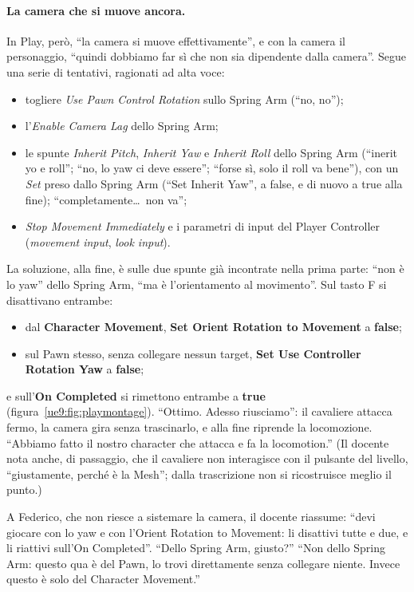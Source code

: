 \paragraph{La camera che si muove ancora.} In Play, però, ``la camera si muove
effettivamente'', e con la camera il personaggio, ``quindi dobbiamo far sì che non sia
dipendente dalla camera''. Segue una serie di tentativi, ragionati ad alta voce:
\begin{itemize}
  \item togliere \emph{Use Pawn Control Rotation} sullo Spring Arm (``no, no'');
  \item l'\emph{Enable Camera Lag} dello Spring Arm;
  \item le spunte \emph{Inherit Pitch}, \emph{Inherit Yaw} e \emph{Inherit Roll} dello
        Spring Arm (``inerit yo e roll''; ``no, lo yaw ci deve essere''; ``forse sì,
        solo il roll va bene''), con un \emph{Set} preso dallo Spring Arm (``Set Inherit
        Yaw'', a false, e di nuovo a true alla fine); ``completamente\dots\ non va'';
  \item \emph{Stop Movement Immediately} e i parametri di input del Player Controller
        (\emph{movement input}, \emph{look input}).
\end{itemize}
La soluzione, alla fine, è sulle due spunte già incontrate nella prima parte: ``non è lo
yaw'' dello Spring Arm, ``ma è l'orientamento al movimento''. Sul tasto F si disattivano
entrambe:
\begin{itemize}
  \item dal \textbf{Character Movement}, \textbf{Set Orient Rotation to Movement} a
        \textbf{false};
  \item sul Pawn stesso, senza collegare nessun target, \textbf{Set Use Controller
        Rotation Yaw} a \textbf{false};
\end{itemize}
e sull'\textbf{On Completed} si rimettono entrambe a \textbf{true}
(figura~\ref{ue9:fig:playmontage}). ``Ottimo. Adesso riusciamo'': il cavaliere attacca
fermo, la camera gira senza trascinarlo, e alla fine riprende la locomozione. ``Abbiamo
fatto il nostro character che attacca e fa la locomotion.'' (Il docente nota anche, di
passaggio, che il cavaliere non interagisce con il pulsante del livello, ``giustamente,
perché è la Mesh''; dalla trascrizione non si ricostruisce meglio il punto.)

A Federico, che non riesce a sistemare la camera, il docente riassume: ``devi giocare con
lo yaw e con l'Orient Rotation to Movement: li disattivi tutte e due, e li riattivi
sull'On Completed''. ``Dello Spring Arm, giusto?'' ``Non dello Spring Arm: questo qua è
del Pawn, lo trovi direttamente senza collegare niente. Invece questo è solo del
Character Movement.''

